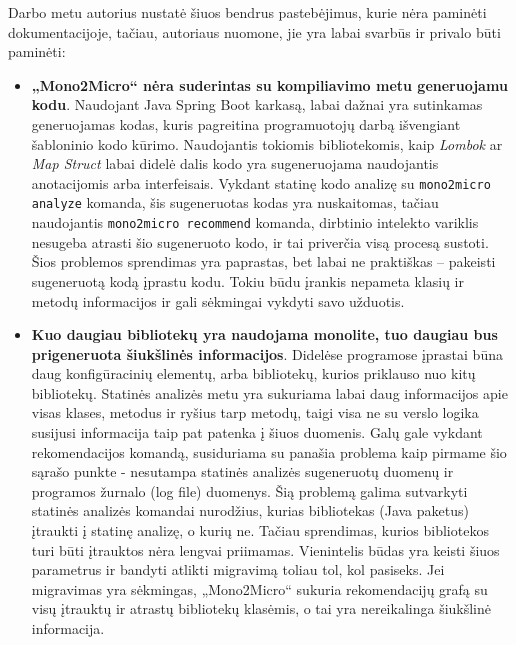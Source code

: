 \documentclass{VUMIFPSbakalaurinis}
\begin{document}
Darbo metu autorius nustatė šiuos bendrus pastebėjimus, kurie nėra paminėti dokumentacijoje, tačiau, autoriaus nuomone, jie yra labai svarbūs ir privalo būti paminėti:
\begin{itemize}
    \item \textbf{„Mono2Micro“ nėra suderintas su kompiliavimo metu generuojamu kodu}. Naudojant Java Spring Boot karkasą, labai dažnai yra sutinkamas generuojamas kodas, kuris pagreitina programuotojų darbą išvengiant šabloninio kodo kūrimo. Naudojantis tokiomis bibliotekomis, kaip \emph{Lombok} ar \emph{Map Struct} labai didelė dalis kodo yra sugeneruojama naudojantis anotacijomis arba interfeisais. Vykdant statinę kodo analizę su \verb|mono2micro analyze| komanda, šis sugeneruotas kodas yra nuskaitomas, tačiau naudojantis \verb|mono2micro recommend| komanda, dirbtinio intelekto variklis nesugeba atrasti šio sugeneruoto kodo, ir tai priverčia visą procesą sustoti. Šios problemos sprendimas yra paprastas, bet labai ne praktiškas -- pakeisti sugeneruotą kodą įprastu kodu. Tokiu būdu įrankis nepameta klasių ir metodų informacijos ir gali sėkmingai vykdyti savo užduotis.

    \item \textbf{Kuo daugiau bibliotekų yra naudojama monolite, tuo daugiau bus prigeneruota šiukšlinės informacijos}. Didelėse programose įprastai būna daug konfigūracinių elementų, arba bibliotekų, kurios priklauso nuo kitų bibliotekų. Statinės analizės metu yra sukuriama labai daug informacijos apie visas klases, metodus ir ryšius tarp metodų, taigi visa ne su verslo logika susijusi informacija taip pat patenka į šiuos duomenis. Galų gale vykdant rekomendacijos komandą, susiduriama su panašia problema kaip pirmame šio sąrašo punkte - nesutampa statinės analizės sugeneruotų duomenų ir programos žurnalo (log file) duomenys. Šią problemą galima sutvarkyti statinės analizės komandai nurodžius, kurias bibliotekas (Java paketus) įtraukti į statinę analizę, o kurių ne. Tačiau sprendimas, kurios bibliotekos turi būti įtrauktos nėra lengvai priimamas. Vienintelis būdas yra keisti šiuos parametrus ir bandyti atlikti migravimą toliau tol, kol pasiseks. Jei migravimas yra sėkmingas, „Mono2Micro“ sukuria rekomendacijų grafą su visų įtrauktų ir atrastų bibliotekų klasėmis, o tai yra nereikalinga šiukšlinė informacija.


\end{itemize}
\end{document}
